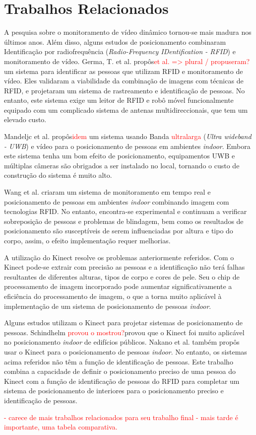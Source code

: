 \section{Trabalhos Relacionados}\label{sec:trabalhos-relacionados}

A pesquisa sobre o monitoramento de vídeo dinâmico tornou-se mais madura nos últimos anos. Além disso, alguns estudos de posicionamento combinaram Identificação por radiofrequência (\textit{Radio-Frequency IDentification - RFID}) e monitoramento de vídeo. Germa, T. et al. \cite{germa2010vision} propôs\textcolor{red}{et al. => plural / propuseram?} um sistema para identificar as pessoas que utilizam RFID e monitoramento de vídeo. Eles validaram a viabilidade da combinação de imagens com técnicas de RFID, e projetaram um sistema de rastreamento e identificação de pessoas. No entanto, este sistema exige um leitor de RFID e robô móvel funcionalmente equipado com um complicado sistema de  antenas multidireccionais, que tem um elevado custo.

Mandeljc et al. \cite{mandeljc2012tracking} propôs\textcolor{red}{idem} um sistema usando Banda \textcolor{red}{ultralarga} (\textit{Ultra wideband - UWB}) e vídeo para o posicionamento de pessoas em ambientes \textit{indoor}. Embora este sistema tenha um bom efeito de posicionamento, equipamentos UWB e múltiplas câmeras são obrigados a ser instalado no local, tornando o custo de construção do sistema é muito alto.

Wang et al. \cite{wang2011flexible,wang2011rfid} criaram um sistema de monitoramento em tempo real e posicionamento de pessoas em ambientes \textit{indoor} combinando imagem com  tecnologias RFID. No entanto, encontra-se experimental e continuam a verificar sobreposição de pessoas e problemas de blindagem, bem como os resultados de posicionamento são susceptíveis de serem influenciadas por altura e tipo do corpo, assim, o efeito implementação requer melhorias.

A utilização do Kinect resolve os problemas anteriormente referidos. Com o Kinect pode-se extrair com precisão as pessoas e a identificação não terá falhas resultantes de diferentes alturas, tipos de corpo e cores de pele. Seu o chip de processamento de imagem incorporado pode aumentar significativamente a eficiência do processamento de imagem, o que a torna muito aplicável à implementação de um sistema de posicionamento de pessoas \textit{indoor}.

Alguns estudos utilizam o Kinect para projetar sistemas de posicionamento de pessoas. Schindhelm \cite{schindhelm2012evaluating} \textcolor{red}{provou o mostrou?}provou que o Kinect foi muito aplicável no posicionamento \textit{indoor} de edifícios públicos. Nakano et al. \cite{nakano2012kinect} também propôs usar o Kinect para o posicionamento de pessoas \textit{indoor}. No entanto, os sistemas acima referidos não têm a função de identificação de pessoas. Este trabalho combina a capacidade de definir o posicionamento preciso de uma pessoa do Kinect com a função de identificação de pessoas do RFID para completar um sistema de posicionamento de interiores para o posicionamento preciso e identificação de pessoas.

\textcolor{red}{- carece de mais trabalhos relacionados para seu trabalho final - mais tarde é importante, uma tabela comparativa.}